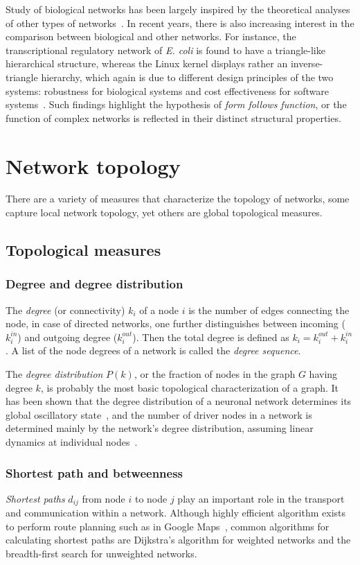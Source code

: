 Study of biological networks has been largely inspired by the theoretical 
analyses of other types of networks~\citep{Barabasi2004}. In recent years, 
there is also increasing interest in the comparison between biological and
other networks. For instance, the transcriptional regulatory network of 
\emph{E. coli} is found to have a triangle-like hierarchical 
structure, whereas the Linux kernel displays rather an inverse-triangle
hierarchy, which again is due to different design principles of the two 
systems: robustness for biological systems and cost effectiveness for 
software systems~\citep{Yan2010}.
Such findings highlight the hypothesis of \emph{form follows function}, or 
the function of complex networks is reflected in their distinct structural 
properties.

\section{Network topology}
There are a variety of measures that characterize the topology of networks,
some capture local network topology, yet others are global topological measures.

\subsection{Topological measures}

\subsubsection{Degree and degree distribution}
The \emph{degree} (or connectivity) $k_i$ of a node $i$ is the number of edges 
connecting the node, in case of directed networks, one further distinguishes
between incoming ($k_i^{in}$) and outgoing degree ($k_i^{out}$). Then the total 
degree is defined as $k_i = k_i^{out} + k_i^{in}$. A list of the node degrees 
of a network is called the \emph{degree sequence}.

The \emph{degree distribution} $P(k)$, or the fraction of nodes in the graph 
$G$ having degree $k$, is probably the most basic topological 
characterization of a graph. It has been shown that the degree distribution of
a neuronal network determines its global oscillatory state~\citep{Roxin2011}, 
and the number of driver nodes in a network is determined mainly by the 
network's degree distribution, assuming linear dynamics at
individual nodes~\citep{Liu2011}.

\subsubsection{Shortest path and betweenness}
\label{sec:shortest_path}
\emph{Shortest paths} $d_{ij}$ from node $i$ to node $j$ play an important 
role in the transport and communication 
within a network. Although highly efficient algorithm exists to perform
route planning such as in Google Maps~\citep{Sanders2005}, common algorithms
for calculating shortest paths are Dijkstra's algorithm for weighted networks
and the breadth-first search for unweighted networks.

